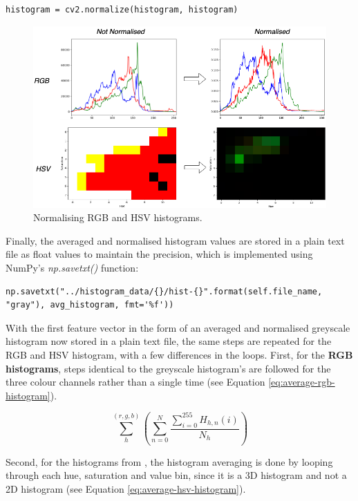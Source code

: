 \begin{lstlisting}[numbers=none]
histogram = cv2.normalize(histogram, histogram)
\end{lstlisting}

\begin{figure}[h] 
\centerline{\includegraphics[width=\textwidth]{figures/implementation/normalise-histogram.png}}
\caption{\label{fig:implementation-normalise-histogram}Normalising RGB and HSV histograms.}
\end{figure}

Finally, the averaged and normalised histogram values are stored in a plain text file as float values to maintain the precision, which is implemented using NumPy's \textit{np.savetxt()} function:

\begin{lstlisting}[numbers=none]
np.savetxt("../histogram_data/{}/hist-{}".format(self.file_name, "gray"), avg_histogram, fmt='%f'))
\end{lstlisting}

With the first feature vector in the form of an averaged and normalised greyscale histogram now stored in a plain text file, the same steps are repeated for the RGB and HSV histogram, with a few differences in the loops. First, for the \textbf{RGB histograms}, steps identical to the greyscale histogram's are followed for the three colour channels rather than a single time (see Equation \ref{eq:average-rgb-histogram}).

\begin{equation}
\label{eq:average-rgb-histogram}
    \sum_{h}^{(r,g,b)} (\sum_{n=0}^{N} \frac{\sum_{i=0}^{255} H_{h,n}(i)}{N_h})
\end{equation}

Second, for the histograms from , the histogram averaging is done by looping through each hue, saturation and value bin, since it is a 3D histogram and not a 2D histogram (see Equation \ref{eq:average-hsv-histogram}).

